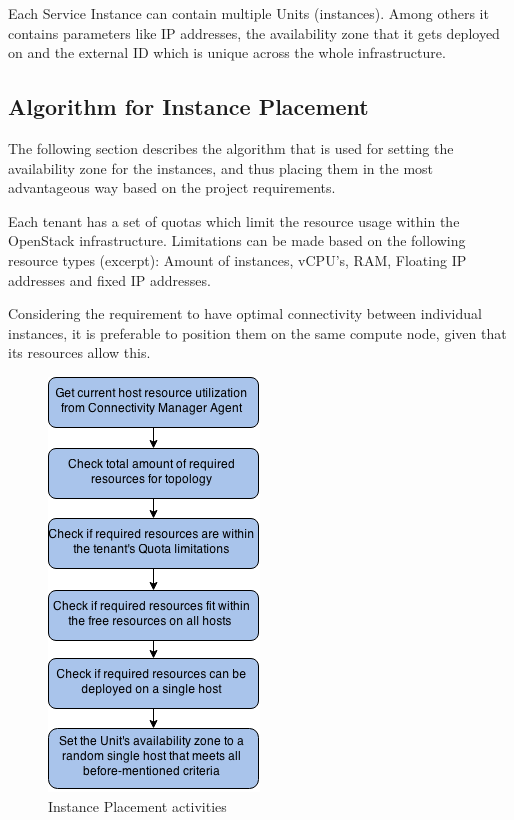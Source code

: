 Each Service Instance can contain multiple Units (instances). Among others it contains parameters like IP addresses, the availability zone that it gets deployed on and the external ID which is unique across the whole infrastructure.



\subsection{Algorithm for Instance Placement}

The following section describes the algorithm that is used for setting the availability zone for the instances, and thus placing them in the most advantageous way based on the project requirements.


Each tenant has a set of quotas which limit the resource usage within the OpenStack infrastructure. Limitations can be made based on the following resource types (excerpt): Amount of instances, vCPU's, RAM, Floating IP addresses and fixed IP addresses.

Considering the requirement to have optimal connectivity between individual instances, it is preferable to position them on the same compute node, given that its resources allow this.

\begin{figure}[H]
\centering

\includegraphics[width=0.5\textwidth]{images/design/cm_instance_placement_engine.png}

\caption{Instance Placement activities}
\end{figure}


